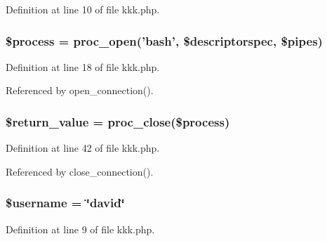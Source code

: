 Definition at line 10 of file kkk.php.
\subsubsection{\setlength{\rightskip}{0pt plus 5cm}\$process = proc\_\-open('bash', \$descriptorspec, \$pipes)}\label{kkk_8php_a3}




Definition at line 18 of file kkk.php.

Referenced by open\_\-connection().
\subsubsection{\setlength{\rightskip}{0pt plus 5cm}\$return\_\-value = proc\_\-close(\$process)}\label{kkk_8php_a4}




Definition at line 42 of file kkk.php.

Referenced by close\_\-connection().
\subsubsection{\setlength{\rightskip}{0pt plus 5cm}\$username = \char`\"{}david\char`\"{}}\label{kkk_8php_a0}




Definition at line 9 of file kkk.php.